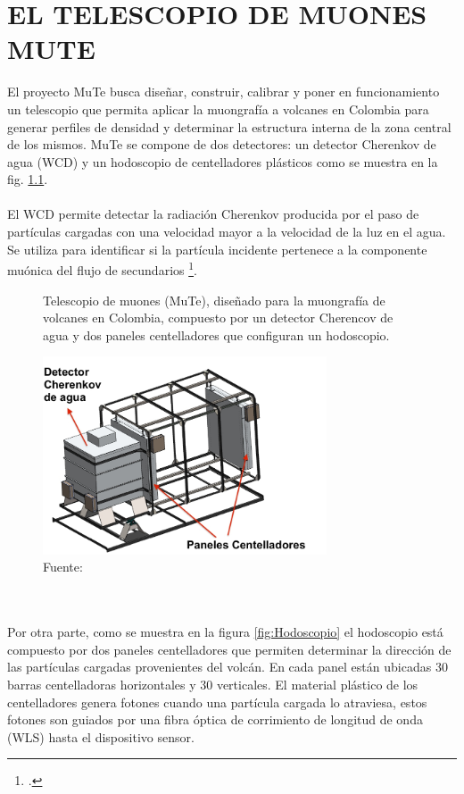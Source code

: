 \chapter{EL TELESCOPIO DE MUONES MUTE}
\label{Cap:MuTe}
El proyecto MuTe busca diseñar, construir, calibrar y poner en funcionamiento un telescopio que permita aplicar la muongrafía a volcanes en Colombia para generar perfiles de densidad y determinar la estructura interna de la zona central de los mismos. MuTe se compone de dos detectores: un detector Cherenkov de agua (WCD) y un hodoscopio de centelladores plásticos como se muestra en la fig. \ref{fig:MuTe}.\\ \\
El WCD permite detectar la radiación Cherenkov producida por el paso de partículas cargadas con una velocidad mayor a la velocidad de la luz en el agua. Se utiliza para identificar si la partícula incidente pertenece a la componente muónica del flujo de secundarios \footcite{Tesis_adriana}.
\begin{figure}[h!]
\begin{centering}
  \caption{Telescopio de muones (MuTe), diseñado para la muongrafía de volcanes en Colombia, compuesto por un detector Cherencov de agua y dos paneles centelladores que configuran un hodoscopio.}
    \includegraphics[width=0.75\textwidth]{Images/Mute.JPG}
    \caption*{Fuente:} %
  \label{fig:MuTe}
  \par\end{centering}
\end{figure}
\\ \\
Por otra parte, como se muestra en la figura \ref{fig:Hodoscopio} el hodoscopio está compuesto por dos paneles centelladores que permiten determinar la dirección de las partículas cargadas provenientes del volcán. En cada panel están ubicadas 30 barras centelladoras horizontales y 30 verticales. El material plástico de los centelladores genera fotones  cuando una partícula cargada lo atraviesa, estos fotones son guiados por una fibra óptica de corrimiento de longitud de onda (WLS) hasta el dispositivo sensor.    
